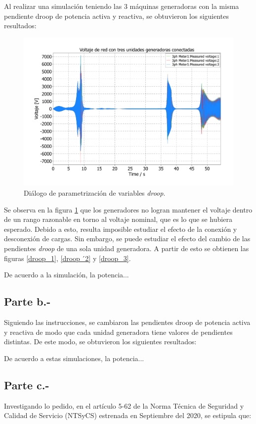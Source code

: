 Al realizar una simulación teniendo las 3 máquinas generadoras con la misma pendiente droop de potencia activa y reactiva, se obtuvieron los siguientes resultados:

\begin{figure}
   \centering
   \includegraphics[width=0.5\linewidth]{Tarea 1/report/imagenes/p3a/resonancia_generadores.pdf}
   \caption{Diálogo de parametrización de variables \textit{droop}.}
   \label{resonancia_generadores}
\end{figure}

Se observa en la figura \ref{resonancia_generadores} que los generadores no logran mantener el voltaje dentro de un rango razonable en torno al voltaje nominal, que es lo que se hubiera esperado. Debido a esto, resulta imposible estudiar el efecto de la conexión y desconexión de cargas. Sin embargo, se puede estudiar el efecto del cambio de las pendientes \textit{droop} de una sola unidad generadora. A partir de esto se obtienen las figuras \ref{droop_1}, \ref{droop_́2} y \ref{droop_3}.


De acuerdo a la simulación, la potencia...

\subsection{Parte b.-}

Siguiendo las instrucciones, se cambiaron las pendientes droop de potencia activa y reactiva de modo que cada unidad generadora tiene valores de pendientes distintas. De este modo, se obtuvieron los siguientes resultados:



De acuerdo a estas simulaciones, la potencia...

\subsection{Parte c.-}

Investigando lo pedido, en el artículo 5-62 de la Norma Técnica de Seguridad y Calidad de Servicio (NTSyCS) estrenada en Septiembre del 2020, se estipula que:\\

